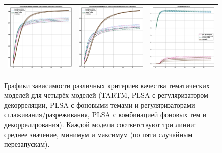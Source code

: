 \begin{figure}
\begin{tabular}{ccc}
    \includegraphics[width=55mm]{images/CH4_vs_regularized_diversity_jensenshannon_False.eps} &   \includegraphics[width=55mm]{images/CH4_vs_regularized_diversity_jensenshannon_True.eps} & \includegraphics[width=55mm]{images/CH4_vs_regularized_SparsityThetaScore.eps} \\ 

\end{tabular} 
    \caption{Графики зависимости различных критериев качества тематических моделей для четырёх моделей (TARTM, PLSA с регуляризатором декорреляции, PLSA с фоновыми темами и регуляризаторами сглаживания/разреживания, PLSA с комбинацией фоновых тем и декоррелирования). Каждой модели соответствуют три линии: среднее значение, минимум и максимум (по пяти случайным перезапускам).} 
\label{fig:ch4_vs_reg} 
\end{figure} 

